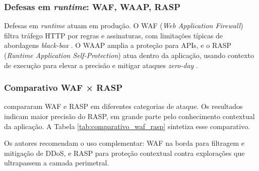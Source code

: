 \subsubsection{Defesas em \textit{runtime}: WAF, WAAP, RASP}

Defesas em \textit{runtime} atuam em produção. O WAF (\textit{Web Application Firewall}) filtra tráfego HTTP por regras e assinaturas, com limitações típicas de abordagens \textit{black-box} \cite{Doupe2010IntrusionDetectionCrawler}. O WAAP amplia a proteção para APIs, e o RASP (\textit{Runtime Application Self-Protection}) atua dentro da aplicação, usando contexto de execução para elevar a precisão e mitigar ataques \textit{zero-day} \cite{SuredaRiera2025TwentyTwoYearsXSS}.

\subsubsection{Comparativo WAF × RASP}

\cite{SuredaRiera2025TwentyTwoYearsXSS} compararam WAF e RASP em diferentes categorias de ataque. Os resultados indicam maior precisão do RASP, em grande parte pelo conhecimento contextual da aplicação. A Tabela \ref{tab:comparativo_waf_rasp} sintetiza esse comparativo.

\begin{table}[htbp]
    \caption{Comparativo empírico WAF × RASP}
    \label{tab:comparativo_waf_rasp}
    
\end{table}

Os autores recomendam o uso complementar: WAF na borda para filtragem e mitigação de DDoS, e RASP para proteção contextual contra explorações que ultrapassem a camada perimetral.
